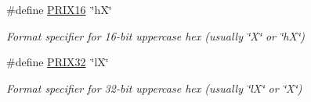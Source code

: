 \begin{DoxyCompactItemize}
\mbox{\label{group__hal_ga570ca9af5087023f75fc8a1a602d26ab}} 
\#define \hyperlink{group__hal_ga570ca9af5087023f75fc8a1a602d26ab}{P\+R\+I\+X16}~\char`\"{}hX\char`\"{}
\begin{DoxyCompactList}\small\item\em Format specifier for 16-\/bit uppercase hex (usually {\ttfamily \char`\"{}\+X\char`\"{}} or {\ttfamily \char`\"{}h\+X\char`\"{}}) \end{DoxyCompactList}\item 
\mbox{\label{group__hal_ga32b0c8a04aae5d4454d15e6cbe109f64}} 
\#define \hyperlink{group__hal_ga32b0c8a04aae5d4454d15e6cbe109f64}{P\+R\+I\+X32}~\char`\"{}lX\char`\"{}
\begin{DoxyCompactList}\small\item\em Format specifier for 32-\/bit uppercase hex (usually {\ttfamily \char`\"{}l\+X\char`\"{}} or {\ttfamily \char`\"{}\+X\char`\"{}}) \end{DoxyCompactList}\end{DoxyCompactItemize}
\label{_amgrp01747264fe7bf50731df0522c351974e}%

